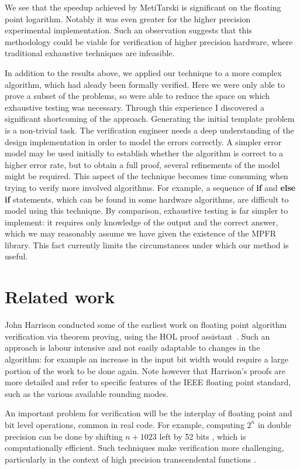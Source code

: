 \documentclass[a4paper]{article}
\begin{document}
We see that the speedup achieved by MetiTarski is significant on the floating point logarithm. Notably it was even greater for the higher precision experimental implementation. Such an observation suggests that this methodology could be viable for verification of higher precision hardware, where traditional exhaustive techniques are infeasible. 

In addition to the results above, we applied our technique to a more complex algorithm, which had aleady been formally verified. Here we were only able to prove a subset of the problems, so were able to reduce the space on which exhaustive testing was necessary. Through this experience I discovered a significant shortcoming of the approach. Generating the initial template problem is a non-trivial task. The verification engineer needs a deep understanding of the design implementation in order to model the errors correctly. A simpler error model may be used initially to establish whether the algorithm is correct to a higher error rate, but to obtain a full proof, several refinements of the model might be required. This aspect of the technique becomes time consuming when trying to verify more involved algorithms. For example, a sequence of \textbf{if} and \textbf{else if} statements, which can be found in some hardware algorithms, are difficult to model using this technique. By comparison, exhaustive testing is far simpler to implement: it requires only knowledge of the output and the correct answer, which we may reasonably assume we have given the existence of the MPFR library. This fact currently limits the circumstances under which our method is useful. 
 
\section{Related work}
John Harrison conducted some of the earliest work on floating point algorithm verification via theorem proving, using the HOL proof assistant~\cite{harrison1997floating}. Such an approach is labour intensive and not easily adaptable to changes in the algorithm: for example an increase in the input bit width would require a large portion of the work to be done again. Note however that Harrison's proofs are more detailed and refer to specific features of the IEEE floating point standard, such as the various available rounding modes. 

An important problem for verification will be the interplay of floating point and bit level operations, common in real code. For example, computing $2^n$ in double precision can be done by shifting $n+1023$ left by 52 bits \cite{mine2012abstract}, which is computationally efficient. Such techniques make verification more challenging, particularly in the context of high precision transcendental functions \cite{lee2016verifying}. 
\end{document}
